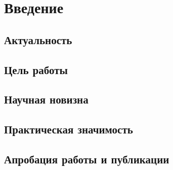 \documentclass[14pt]{extreport}
\begin{document}
\pagebreak

\tableofcontents











\chapter*{Введение}

\section*{Актуальность}
\Actuality

\section*{Цель работы}
\Objective

\section*{Научная новизна}
\Novelty

\section*{Практическая значимость}
\PracticalValue

\section*{Апробация работы и публикации}
\Pub
\end{document}
